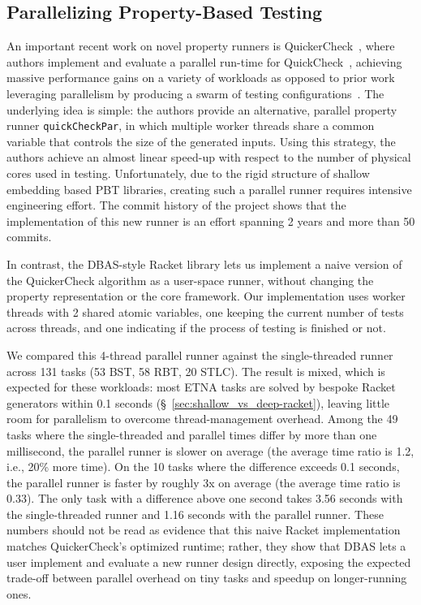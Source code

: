 \subsection{Parallelizing Property-Based Testing} \label{sec:parallel-experiment}

An important recent work on novel property runners is
QuickerCheck~\cite{ParallelTesting}, where authors implement and evaluate a parallel
run-time for QuickCheck~\cite{ClaessenH00}, achieving massive performance gains on a
variety of workloads as opposed to prior work leveraging parallelism by producing a
swarm of testing configurations~\cite{swarm-testing}. The underlying idea is simple:
the authors provide an alternative, parallel property runner {\tt quickCheckPar}, in
which multiple worker threads share a common variable that controls the size of the
generated inputs. Using this strategy, the authors achieve an almost linear speed-up
with respect to the number of physical cores used in testing. Unfortunately, due to the
rigid structure of shallow embedding based PBT libraries, creating such a parallel
runner requires intensive engineering effort. The commit history of the project shows
that the implementation of this new runner is an effort spanning 2 years and more than
50 commits.

In contrast, the DBAS-style Racket library lets us implement a naive version of the
QuickerCheck algorithm as a user-space runner, without changing the property
representation or the core framework. Our implementation uses worker threads with 2
shared atomic variables, one keeping the current number of tests across threads, and
one indicating if the process of testing is finished or not.

We compared this 4-thread parallel runner against the single-threaded runner across 131
tasks (53 BST, 58 RBT, 20 STLC). The result is mixed, which is expected for these
workloads: most ETNA tasks are solved by bespoke Racket generators within 0.1 seconds
(\S~\ref{sec:shallow_vs_deep-racket}), leaving little room for parallelism to overcome
thread-management overhead. Among the 49 tasks where the single-threaded and parallel
times differ by more than one millisecond, the parallel runner is slower on average
(the average time ratio is 1.2, i.e., 20\% more time). On the 10 tasks where the
difference exceeds 0.1 seconds, the parallel runner is faster by roughly 3x on average
(the average time ratio is 0.33). The only task with a difference above one second
takes 3.56 seconds with the single-threaded runner and 1.16 seconds with the parallel
runner. These numbers should not be read as evidence that this naive Racket
implementation matches QuickerCheck's optimized runtime; rather, they show that DBAS
lets a user implement and evaluate a new runner design directly, exposing the expected
trade-off between parallel overhead on tiny tasks and speedup on longer-running ones.

